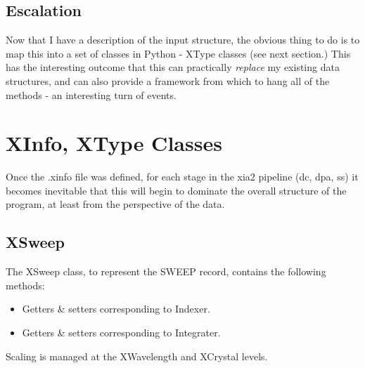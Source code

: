 \documentclass[a4paper, 11pt]{article}
\begin{document}
\subsection{Escalation}

Now that I have a description of the input structure, the obvious thing
to do is to map this into a set of classes in Python - XType classes
(see next section.) This has the interesting outcome that this can practically
\emph{replace} my existing data structures, and can also provide a 
framework from which to hang all of the methods - an interesting turn of
events.

\section{XInfo, XType Classes}

Once the .xinfo file was defined, for each stage in the xia2 pipeline
(dc, dpa, ss) it becomes inevitable that this will begin to dominate the
overall structure of the program, at least from the perspective of the 
data. 

\subsection{XSweep}

The XSweep class, to represent the SWEEP record, contains the following 
methods:

\begin{itemize}
\item{Getters \& setters corresponding to Indexer.}
\item{Getters \& setters corresponding to Integrater.}
\end{itemize}

Scaling is managed at the XWavelength and XCrystal levels.
\end{document}

